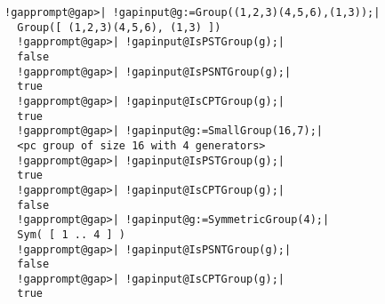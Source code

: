 \documentclass[a4paper,11pt]{report}
\begin{document}
{{{ 
\begin{Verbatim}[commandchars=!@|,fontsize=\small,frame=single,label=Example]
  !gapprompt@gap>| !gapinput@g:=Group((1,2,3)(4,5,6),(1,3));|
  Group([ (1,2,3)(4,5,6), (1,3) ])
  !gapprompt@gap>| !gapinput@IsPSTGroup(g);|
  false
  !gapprompt@gap>| !gapinput@IsPSNTGroup(g);|
  true
  !gapprompt@gap>| !gapinput@IsCPTGroup(g);|
  true
  !gapprompt@gap>| !gapinput@g:=SmallGroup(16,7);|
  <pc group of size 16 with 4 generators>
  !gapprompt@gap>| !gapinput@IsPSTGroup(g);|
  true
  !gapprompt@gap>| !gapinput@IsCPTGroup(g);|
  false
  !gapprompt@gap>| !gapinput@g:=SymmetricGroup(4);|
  Sym( [ 1 .. 4 ] )
  !gapprompt@gap>| !gapinput@IsPSNTGroup(g);|
  false
  !gapprompt@gap>| !gapinput@IsCPTGroup(g);|
  true
\end{Verbatim}
 }

 }

 }

 
\end{document}
